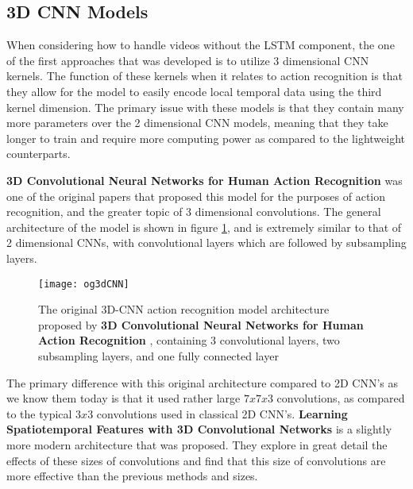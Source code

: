 \subsection{3D CNN Models}
\label{sec:3dCNNModels}

When considering how to handle videos without the LSTM component, the one of the first approaches that was developed is to utilize 3 dimensional CNN kernels. The function of these kernels when it relates to action recognition is that they allow for the model to easily encode local temporal data using the third kernel dimension. The primary issue with these models is that they contain many more parameters over the 2 dimensional CNN models, meaning that they take longer to train and require more computing power as compared to the lightweight counterparts.

\textbf{3D Convolutional Neural Networks for Human Action Recognition} \cite{3DCNN-ActionRecognition} was one of the original papers that proposed this model for the purposes of action recognition, and the greater topic of 3 dimensional convolutions. The general architecture of the model is shown in figure \ref{fig:original3dcnn}, and is extremely similar to that of 2 dimensional CNNs, with convolutional layers which are followed by subsampling layers.

\begin{figure}[ht]
	\texttt{[image: og3dCNN]}
	\centering
	\caption{The original 3D-CNN action recognition model architecture proposed by \textbf{3D Convolutional Neural Networks for Human Action Recognition} \cite{3DCNN-ActionRecognition}, containing 3 convolutional layers, two subsampling layers, and one fully connected layer}
	\label{fig:original3dcnn}
\end{figure}

The primary difference with this original architecture compared to 2D CNN's as we know them today is that it used rather large $7x7x3$ convolutions, as compared to the typical $3x3$ convolutions used in classical 2D CNN's. \textbf{Learning Spatiotemporal Features with 3D Convolutional Networks} \cite{3x33dcnn} is a slightly more modern architecture that was proposed. They explore in great detail the effects of these sizes of convolutions and find that this size of convolutions are more effective than the previous methods and sizes.

